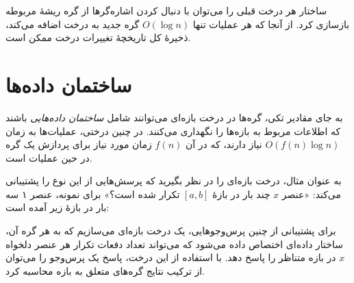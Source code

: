 ساختار هر درخت قبلی را می‌توان
با دنبال کردن اشاره‌گرها از گره ریشهٔ مربوطه
بازسازی کرد.
از آنجا که هر عملیات
تنها $O(\log n)$ گره جدید به درخت اضافه می‌کند،
ذخیرهٔ کل تاریخچهٔ تغییرات درخت ممکن است.

\section{ساختمان داده‌ها}

به جای مقادیر تکی، گره‌ها در درخت بازه‌ای
می‌توانند شامل \emph{ساختمان داده‌هایی} باشند که اطلاعات
مربوط به بازه‌ها را نگهداری می‌کنند.
در چنین درختی، عملیات‌ها به زمان
$O(f(n) \log n)$ نیاز دارند، که در آن $f(n)$
زمان مورد نیاز برای پردازش یک گره در حین عملیات است.

به عنوان مثال، درخت بازه‌ای را در نظر بگیرید که
پرسش‌هایی از این نوع را پشتیبانی می‌کند:
«عنصر $x$ چند بار
در بازهٔ $[a,b]$ تکرار شده است؟»
برای نمونه، عنصر ۱ سه بار
در بازهٔ زیر آمده است:

\begin{center}
\end{center}

برای پشتیبانی از چنین پرس‌وجوهایی، یک درخت بازه‌ای می‌سازیم
که به هر گره آن، ساختار داده‌ای اختصاص داده می‌شود
که می‌تواند تعداد دفعات تکرار هر عنصر دلخواه $x$
در بازه متناظر را پاسخ دهد.
با استفاده از این درخت،
پاسخ یک پرس‌وجو را می‌توان
از ترکیب نتایج گره‌های متعلق به بازه
محاسبه کرد.


